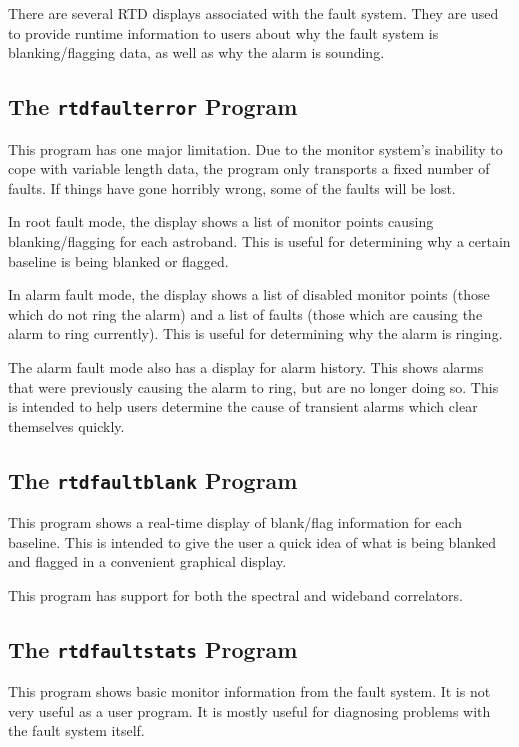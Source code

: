\documentclass[letterpaper,12pt,oneside,pdftex]{article}
\begin{document}
There are several RTD displays associated with the fault system. They are
used to provide runtime information to users about why the fault system is
blanking/flagging data, as well as why the alarm is sounding.

\subsection{The \texttt{rtdfaulterror} Program}

This program has one major limitation. Due to the monitor system's inability to
cope with variable length data, the program only transports a fixed number of
faults. If things have gone horribly wrong, some of the faults will be lost.

In root fault mode, the display shows a list of monitor points causing
blanking/flagging for each astroband. This is useful for determining why a
certain baseline is being blanked or flagged.

In alarm fault mode, the display shows a list of disabled monitor points (those
which do not ring the alarm) and a list of faults (those which are causing the
alarm to ring currently). This is useful for determining why the alarm is
ringing.

The alarm fault mode also has a display for alarm history. This shows alarms
that were previously causing the alarm to ring, but are no longer doing so. This
is intended to help users determine the cause of transient alarms which clear
themselves quickly.

\subsection{The \texttt{rtdfaultblank} Program}

This program shows a real-time display of blank/flag information for each
baseline. This is intended to give the user a quick idea of what is being
blanked and flagged in a convenient graphical display.

This program has support for both the spectral and wideband correlators.

\subsection{The \texttt{rtdfaultstats} Program}

This program shows basic monitor information from the fault system. It is not
very useful as a user program. It is mostly useful for diagnosing problems with
the fault system itself.
\end{document}
